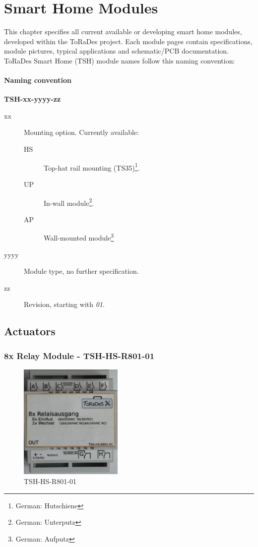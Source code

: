 \documentclass[]{scrreprt}%
\begin{document}
\chapter{Smart Home Modules}

This chapter specifies all current available or developing smart home modules, developed within the ToRaDes project.
Each module pages contain specifications, module pictures, typical applications and schematic/PCB documentation.
ToRaDes Smart Home (TSH) module names follow this naming convention:

\subsubsection{Naming convention}
\begin{center}
\textbf{TSH-xx-yyyy-zz} 
\end{center}
\begin{description}
 \item[xx] Mounting option. Currently available:
    \begin{description}
      \item[HS] Top-hat rail mounting (TS35)\footnote{German: Hutschiene}.
      \item[UP] In-wall module\footnote{German: Unterputz}.
      \item[AP] Wall-mounted module\footnote{German: Aufputz}
    \end{description}
 \item[yyyy] Module type, no further specification.
 \item[zz] Revision, starting with \textit{01}.
\end{description}

\section{Actuators}

\newpage
\subsection{8x Relay Module - TSH-HS-R801-01}

\begin{figure}[htb]
  \centering
  \label{img:TSH-HS-R801-01}
  \includegraphics[width=50mm]{img/mod/TSH-HS-R801-01.png}
  \caption{TSH-HS-R801-01}
\end{figure}
\end{document}
